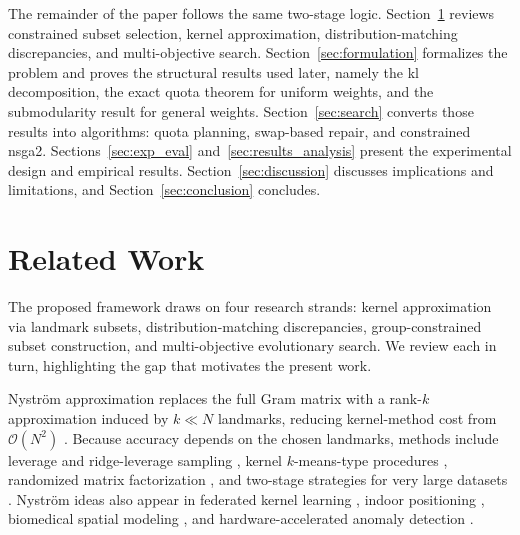 \documentclass[10pt,journal]{IEEEtran}
\newcommand{\1}{\mathbf{1}}
\theoremstyle{ieeethm}
\begin{document}
The remainder of the paper follows the same two-stage logic. Section~\ref{sec:related} reviews constrained subset selection, kernel approximation, distribution-matching discrepancies, and multi-objective search. Section~\ref{sec:formulation} formalizes the problem and proves the structural results used later, namely the \gls{kl} decomposition, the exact quota theorem for uniform weights, and the submodularity result for general weights. Section~\ref{sec:search} converts those results into algorithms: quota planning, swap-based repair, and constrained \gls{nsga2}. Sections~\ref{sec:exp_eval} and~\ref{sec:results_analysis} present the experimental design and empirical results. Section~\ref{sec:discussion} discusses implications and limitations, and Section~\ref{sec:conclusion} concludes.

\section{Related Work}
\label{sec:related}

The proposed framework draws on four research strands: kernel approximation via landmark subsets, distribution-matching discrepancies, group-constrained subset construction, and multi-objective evolutionary search. We review each in turn, highlighting the gap that motivates the present work.

Nystr\"{o}m approximation replaces the full Gram matrix with a rank-$k$ approximation induced by $k\!\ll\!N$ landmarks, reducing kernel-method cost from $\mathcal{O}(N^2)$ \cite{williams2001nystrom,gittens2016nystrom}. Because accuracy depends on the chosen landmarks, methods include leverage and ridge-leverage sampling \cite{natoleverage2011,alaoui2015rr}, kernel $k$-means-type procedures \cite{he_zhang_2018,wang2019scalablekkmeans}, randomized matrix factorization \cite{Li_Bi_Kwok_2015,golub2013matrix}, and two-stage strategies for very large datasets \cite{he2026twostepnystrom}. Nyström ideas also appear in federated kernel learning \cite{zhang_li_yin_wang_2026}, indoor positioning \cite{rekkas2024vlp}, biomedical spatial modeling \cite{liu_farahani_li_xie_2025}, and hardware-accelerated anomaly detection \cite{aftowicz_fritscher_lehniger_2024}.
\end{document}
